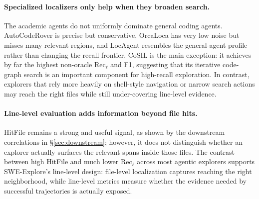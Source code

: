  
\paragraph{Specialized localizers only help when they broaden search.}
The academic agents do not uniformly dominate general coding agents. AutoCodeRover is precise but conservative, OrcaLoca has very low noise but misses many relevant regions, and LocAgent resembles the general-agent profile rather than changing the recall frontier. CoSIL is the main exception: it achieves by far the highest non-oracle Rec$_\ell$ and F1, suggesting that its iterative code-graph search is an important component for high-recall exploration. In contrast, explorers that rely more heavily on shell-style navigation or narrow search actions may reach the right files while still under-covering line-level evidence.

\paragraph{Line-level evaluation adds information beyond file hits.}
HitFile remains a strong and useful signal, as shown by the downstream correlations in \S\ref{sec:downstream}; however, it does not distinguish whether an explorer actually surfaces the relevant spans inside those files. The contrast between high HitFile and much lower Rec$_\ell$ across most agentic explorers supports SWE-Explore's line-level design: file-level localization captures reaching the right neighborhood, while line-level metrics measure whether the evidence needed by successful trajectories is actually exposed.































\vspace{-3mm}

